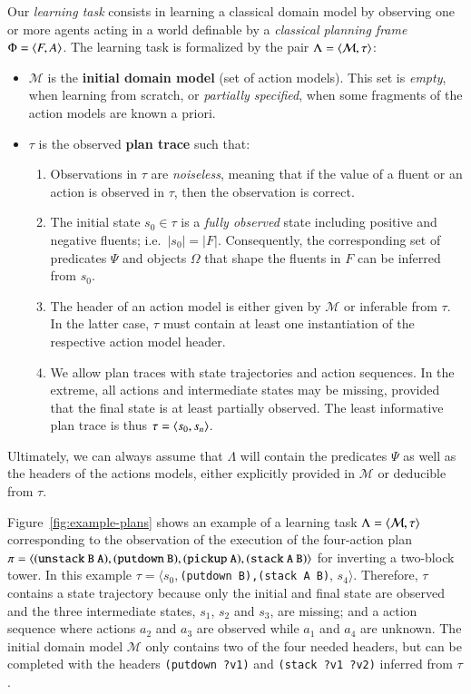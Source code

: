 Our {\em learning task} consists in learning a classical domain model by observing one or more agents acting in a world definable by a {\em classical planning frame} $\Phi={\langle F,A \rangle}$. The learning task is formalized by the pair $\Lambda={\langle \mathcal{M},\tau \rangle}$:


\begin{itemize}
\item $\mathcal{M}$ is the {\bf initial domain model} (set of action models). This set is {\em empty}, when learning from scratch, or {\em partially specified}, when some fragments of the action models are known a priori.
\item $\tau$ is the observed {\bf plan trace} such that:
\begin{enumerate}
 \item Observations in $\tau$ are {\em noiseless}, meaning that if the value of a fluent or an action is observed in $\tau$, then the observation is correct.
\item The initial state $s_0\in\tau$ is a {\em fully observed} state including positive and negative fluents; i.e.~$|s_0|=|F|$. Consequently, the corresponding set of predicates $\Psi$ and objects $\Omega$ that shape the fluents in $F$ can be inferred from $s_0$.
\item The header of an action model is either given by $\mathcal{M}$ or inferable from $\tau$. In the latter case, $\tau$ must contain at least one instantiation of the respective action model header.
\item We allow plan traces with \NO state trajectories and \NO action sequences. In the extreme, all actions and intermediate states may be missing, provided that the final state is at least partially observed. The least informative plan trace is thus $\tau = {\langle s_0,s_n \rangle}$.
\end{enumerate}
\end{itemize}

Ultimately, we can always assume that $\Lambda$ will contain the predicates $\Psi$ as well as the headers of the actions models, either explicitly provided in $\mathcal{M}$ or deducible from $\tau$.

\vspace{0.1cm}

Figure~\ref{fig:example-plans} shows an example of a learning task $\Lambda={\langle \mathcal{M},\tau \rangle}$ corresponding to the observation of the execution of the four-action plan $\pi={\langle \small\tt (unstack\ B\ A), (putdown\ B), (pickup\ A), (stack\ A\ B) \rangle}$ for inverting a two-block tower. In this example $\tau=\langle s_0,${\small\tt (putdown\ B),(stack\ A\ B)}, $s_4\rangle$. Therefore, $\tau$ contains a \NO state trajectory because only the initial and final state are observed and the three intermediate states, $s_1$, $s_2$ and $s_3$, are missing; and a \PO action sequence where actions $a_2$ and $a_3$ are observed while $a_1$ and $a_4$ are unknown. The initial domain model $\mathcal{M}$ only contains two of the four needed headers, but can be completed with the headers {\small\tt(putdown ?v1)} and {\small\tt(stack ?v1 ?v2)} inferred from $\tau$.

